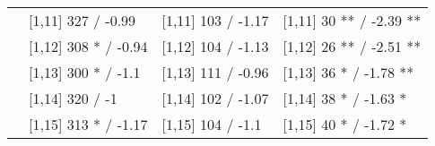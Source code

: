 \begin{table}
\begin{tabular}[t]{llll}
 & {}[1,11] 327  / -0.99 & {}[1,11] 103  / -1.17 & {}[1,11] 30 ** / -2.39 **\\
 & {}[1,12] 308 * / -0.94 & {}[1,12] 104  / -1.13 & {}[1,12] 26 ** / -2.51 **\\
\addlinespace
 & {}[1,13] 300 * / -1.1 & {}[1,13] 111  / -0.96 & {}[1,13] 36 * / -1.78 **\\
 & {}[1,14] 320  / -1 & {}[1,14] 102  / -1.07 & {}[1,14] 38 * / -1.63 *\\
 & {}[1,15] 313 * / -1.17 & {}[1,15] 104  / -1.1 & {}[1,15] 40 * / -1.72 *\\
\bottomrule
\end{tabular}
\end{table}

